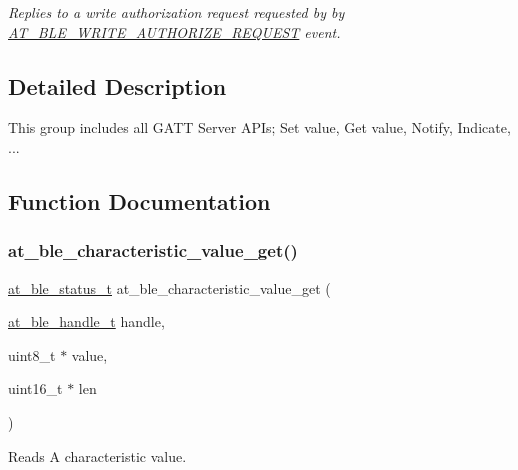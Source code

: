 \begin{DoxyCompactItemize}
\begin{DoxyCompactList}\small\item\em Replies to a write authorization request requested by by \mbox{\hyperlink{at__ble__api_8h_a3324640b95f33169515f89738ed5baebac18b89e2db777b2340f2f01b93466f18}{A\+T\+\_\+\+B\+L\+E\+\_\+\+W\+R\+I\+T\+E\+\_\+\+A\+U\+T\+H\+O\+R\+I\+Z\+E\+\_\+\+R\+E\+Q\+U\+E\+ST}} event. \end{DoxyCompactList}\end{DoxyCompactItemize}


\subsection{Detailed Description}
This group includes all G\+A\+TT Server A\+P\+Is; Set value, Get value, Notify, Indicate, ... 



\subsection{Function Documentation}
\mbox{\label{group__gatt__server__group_ga8397f87decb36953e937f04390c3ffa7}} 
\subsubsection{\texorpdfstring{at\_ble\_characteristic\_value\_get()}{at\_ble\_characteristic\_value\_get()}}
{\footnotesize\ttfamily \mbox{\hyperlink{group__error__codes__group_ga3b1db9b95feb157b3c188ca27fe76988}{at\+\_\+ble\+\_\+status\+\_\+t}} at\+\_\+ble\+\_\+characteristic\+\_\+value\+\_\+get (\begin{DoxyParamCaption}\item[{\mbox{\hyperlink{at__ble__api_8h_abd23646d0c662860741f787efc8456f2}{at\+\_\+ble\+\_\+handle\+\_\+t}}}]{handle,  }\item[{uint8\+\_\+t $\ast$}]{value,  }\item[{uint16\+\_\+t $\ast$}]{len }\end{DoxyParamCaption})}



Reads A characteristic value. 


